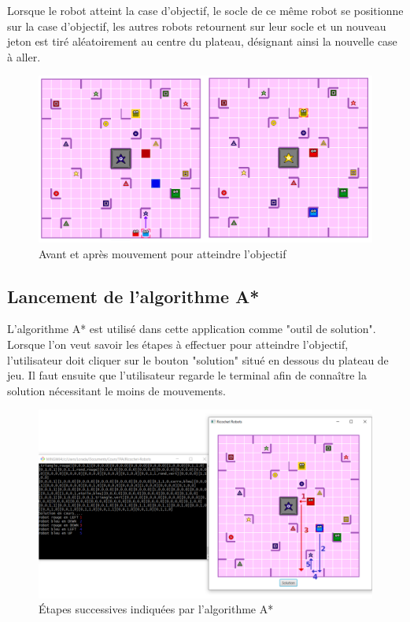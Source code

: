 \documentclass[a4paper, 12pt]{article}
\begin{document}
        Lorsque le robot atteint la case d'objectif, le socle de ce même robot se positionne sur la case d'objectif, les autres robots retournent sur leur socle et un nouveau jeton est tiré aléatoirement au centre du plateau, désignant ainsi la nouvelle case à aller.
        
        \begin{figure}[H]
            \centering
            \includegraphics[scale=0.5]{images/objectifAtteint.PNG}
            \caption{Avant et après mouvement pour atteindre l'objectif}
        \end{figure}

    \subsection{Lancement de l'algorithme A*}
    
        L'algorithme A* est utilisé dans cette application comme "outil de solution". Lorsque l'on veut savoir les étapes à effectuer pour atteindre l'objectif, l'utilisateur doit cliquer sur le bouton "solution" situé en dessous du plateau de jeu. Il faut ensuite que l'utilisateur regarde le terminal afin de connaître la solution nécessitant le moins de mouvements.
        
        \begin{figure}[H]
            \centering
            \includegraphics[scale=0.5]{images/mouvementsIa.PNG}
            \caption{Étapes successives indiquées par l'algorithme A*}
        \end{figure}
\end{document}
